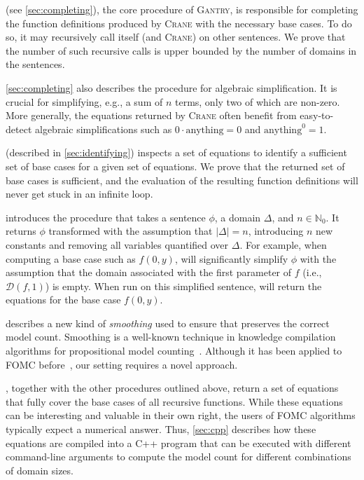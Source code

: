 \documentclass[a4paper,UKenglish,cleveref, autoref, thm-restate]{lipics-v2021}
\newcommand{\Cranetwo}{\textsc{Gantry}}
\begin{document}
\CompileWithBaseCases (see \cref{sec:completing}), the core procedure of
\Cranetwo{}, is responsible for completing the function definitions produced by
\textsc{Crane} with the necessary base cases. To do so, it may recursively call
itself (and \textsc{Crane}) on other sentences. We prove that the number of such
recursive calls is upper bounded by the number of domains in the sentences.

\cref{sec:completing} also describes the \Simplify procedure for algebraic
simplification. It is crucial for simplifying, e.g., a sum of $n$ terms, only
two of which are non-zero. More generally, the equations returned by
\textsc{Crane} often benefit from easy-to-detect algebraic simplifications such
as $0 \cdot \text{anything} = 0$ and $\text{anything}^{0} = 1$.

\FindBaseCases (described in \cref{sec:identifying}) inspects a set of equations
to identify a sufficient set of base cases for a given set of equations. We
prove that the returned set of base cases is sufficient, and the evaluation of
the resulting function definitions will never get stuck in an infinite loop.

 introduces the \Propagate procedure that takes a sentence
$\phi$, a domain $\Delta$, and $n \in \mathbb{N}_{0}$. It returns $\phi$
transformed with the assumption that $|\Delta| = n$, introducing $n$ new
constants and removing all variables quantified over $\Delta$. For example, when
computing a base case such as $f(0, y)$, \Propagate will significantly simplify
$\phi$ with the assumption that the domain associated with the first parameter
of $f$ (i.e., $\mathcal{D}(f, 1)$) is empty. When run on this simplified
sentence, \CompileWithBaseCases will return the equations for the base case
$f(0, y)$.

 describes a new kind of \emph{smoothing} used to ensure
that \Propagate preserves the correct model count. Smoothing is a well-known
technique in knowledge compilation algorithms for propositional model
counting~\cite{darwiche2001tractable}. Although it has been applied to FOMC
before~\cite{DBLP:conf/ijcai/BroeckTMDR11}, our setting requires a novel
approach.

\CompileWithBaseCases, together with the other procedures outlined above, return
a set of equations that fully cover the base cases of all recursive functions.
While these equations can be interesting and valuable in their own right, the
users of FOMC algorithms typically expect a numerical answer. Thus,
\cref{sec:cpp} describes how these equations are compiled into a C++ program
that can be executed with different command-line arguments to compute the model
count for different combinations of domain sizes.
\end{document}
